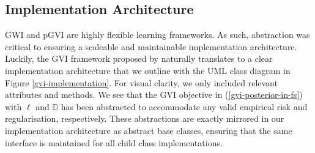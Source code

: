 \documentclass{article}
\numberwithin{equation}{section}
\begin{document}
\subsection{Implementation Architecture}\label{implementation-architecture}
GWI and pGVI are highly flexible learning frameworks. As such, abstraction was critical to ensuring a scaleable and maintainable implementation architecture.
Luckily, the GVI framework proposed by \cite{knoblauch2022optimization} naturally translates to a clear implementation architecture that we outline with the UML class diagram in Figure \ref{gvi-implementation}.
For visual clarity, we only included relevant attributes and methods.
We see that the GVI objective in (\ref{gvi-posterior-in-fs}) with $\ell$ and $\mathbb{D}$ has been abstracted to accommodate any valid empirical risk and regularisation, respectively.
These abstractions are exactly mirrored in our implementation architecture as abstract base classes, ensuring that the same interface is maintained for all child class implementations.
\end{document}
